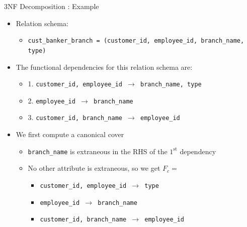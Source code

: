 \documentclass[aspectratio=169, xcolor=dvipsnames]{beamer}
\begin{document}
\begin{frame}{3NF Decomposition : Example}
    \begin{itemize}[<+->]
        \item Relation schema:
        \begin{itemize}
            \item[$\triangleright$] \texttt{cust\_banker\_branch = (customer\_id, employee\_id, branch\_name, type)}
        \end{itemize}
        \item The functional dependencies for this relation schema are:
        \begin{itemize}
            \item[$\triangleright$] 1. \texttt{customer\_id, employee\_id $\rightarrow$ branch\_name, type}
            \item[$\triangleright$] 2. \texttt{employee\_id $\rightarrow$ branch\_name}
            \item[$\triangleright$] 3. \texttt{customer\_id, branch\_name $\rightarrow$ employee\_id}
        \end{itemize}
        \item We first compute a canonical cover
        \begin{itemize}
            \item[$\triangleright$] \texttt{branch\_name} is extraneous in the RHS of the $1^{\text{st}}$ dependency
            \item[$\triangleright$] No other attribute is extraneous, so we get $F_c =$
            \begin{itemize}
                \item[$\star$] \texttt{customer\_id, employee\_id $\rightarrow$ type}
                \item[$\star$] \texttt{employee\_id $\rightarrow$ branch\_name}
                \item[$\star$] \texttt{customer\_id, branch\_name $\rightarrow$ employee\_id}
            \end{itemize}
        \end{itemize}
    \end{itemize}
\end{frame}
\end{document}
